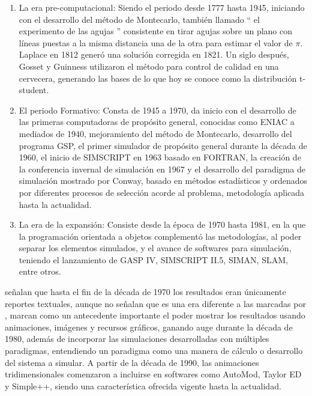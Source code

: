 \begin{enumerate}
    \item La era pre-computacional: Siendo el periodo desde 1777 hasta 1945, iniciando con el desarrollo del método de Montecarlo, también llamado  `` el experimento de las agujas '' consistente en tirar agujas sobre un plano con líneas puestas a la misma distancia una de la otra para estimar el valor de $\pi$. Laplace en 1812 generó una solución corregida en 1821. Un siglo después, Gosset y Guinness utilizaron el método para control de calidad en una cervecera, generando las bases de lo que hoy se conoce como la distribución t-student.
    \item El periodo Formativo: Consta de 1945 a 1970, da inicio con el desarrollo de las primeras computadoras de propósito general, conocidas como ENIAC a mediados de 1940, mejoramiento del método de Montecarlo, desarrollo del programa GSP, el primer simulador de propósito general durante la década de 1960, el inicio de SIMSCRIPT en 1963 basado en FORTRAN, la creación de la conferencia invernal de simulación en 1967 y el desarrollo del paradigma de simulación mostrado por Conway, basado en métodos estadísticos y ordenados por diferentes procesos de selección acorde al problema, metodología aplicada hasta la actualidad.
    \item La era de la expansión: Consiste desde la época de 1970 hasta 1981, en la que la programación orientada a objetos complementó las metodologías, al poder separar los elementos simulados, y el avance de softwares para simulación, teniendo el lanzamiento de GASP IV, SIMSCRIPT II.5, SIMAN, SLAM, entre otros.
\end{enumerate}

\textcite{roberts1} señalan que hasta el fin de la década de 1970 los resultados eran únicamente reportes textuales, aunque no señalan que es una era diferente a las marcadas por \textcite{goldsman1}, marcan como un antecedente importante el poder mostrar los resultados usando animaciones, imágenes y recursos gráficos, ganando auge durante la década de 1980, además de incorporar las simulaciones desarrolladas con múltiples paradigmas, entendiendo un paradigma como una manera de cálculo o desarrollo del sistema a simular. A partir de la década de 1990, las animaciones tridimensionales comenzaron a incluirse en softwares como AutoMod, Taylor ED y Simple++, siendo una característica ofrecida vigente hasta la actualidad.

